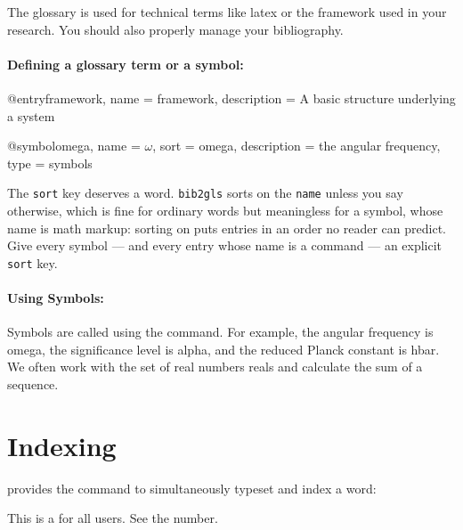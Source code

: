 The glossary is used for technical terms like \gls{latex} or the \gls{framework} used in your research. You should also properly manage your \gls{bibliography}.

\paragraph{Defining a glossary term or a symbol:}
\begin{latexcode}
@entry{framework,
  name        = {framework},
  description = {A basic structure underlying a system}
}

@symbol{omega,
  name        = {\ensuremath{\omega}},
  sort        = {omega},     %
  description = {the angular frequency},
  type        = {symbols}
}
\end{latexcode}

The \texttt{sort} key deserves a word.  \texttt{bib2gls} sorts on the
\texttt{name} unless you say otherwise, which is fine for ordinary words but
meaningless for a symbol, whose name is math markup: sorting on
\latexinline{\ensuremath{\omega}} puts entries in an order no reader can
predict.  Give every symbol --- and every entry whose name is a command ---
an explicit \texttt{sort} key.

\paragraph{Using Symbols:}
Symbols are called using the \latexinline{\gls} command. For example, the angular frequency is \gls{omega}, the significance level is \gls{alpha}, and the reduced Planck constant is \gls{hbar}. We often work with the set of real numbers \gls{reals} and calculate the \gls{sum} of a sequence.


\section{Indexing}
\label{sec:indexing}

\novathesis{} provides the \latexinline{\ntindex} command to simultaneously typeset and index a word:

\begin{latexcode}
This is a  for all users.
See the  number.
\end{latexcode}

